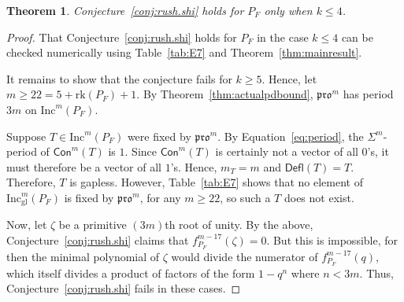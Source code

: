 \documentclass[12pt]{amsart}
\newtheorem{theorem}{Theorem}[section]
\theoremstyle{definition}
\theoremstyle{remark}
\numberwithin{equation}{section}
\newcommand{\inc}{\ensuremath{\mathrm{Inc}}}
\newcommand{\incgl}{\inc_{\mathrm{gl}}}
\newcommand{\pro}{\mathfrak{pro}}
\newcommand{\rank}{\ensuremath{\mathrm{rk}}}
\newcommand{\deflate}{\ensuremath{\mathsf{Defl}}}
\newcommand{\content}{\ensuremath{\mathsf{Con}}}
\begin{document}
\begin{theorem}\label{thm:F_bad}
Conjecture~\ref{conj:rush.shi} holds for $P_F$ only when $k \leq 4$.
\end{theorem}
\begin{proof}
That Conjecture~\ref{conj:rush.shi} holds for $P_F$ in the case $k \leq 4$ can be checked numerically using Table~\ref{tab:E7} and Theorem~\ref{thm:mainresult}.

It remains to show that the conjecture fails for $k \geq 5$. Hence, let $m \geq 22 = 5 +  \rank(P_F) + 1$. By Theorem~\ref{thm:actualpdbound}, $\pro^m$ has period $3m$ on $\inc^m(P_F)$. 

Suppose $T \in \inc^m(P_F)$ were fixed by $\pro^m$.  By Equation~\ref{eq:period}, the $\Sigma^m$-period of $\content^m(T)$ is $1$. Since $\content^m(T)$ is certainly not a vector of all $0$'s, it must therefore be a vector of all $1$'s. Hence, $m_T = m$ and $\deflate(T) = T$. Therefore, $T$ is gapless. However, Table~\ref{tab:E7} shows that no element of $\incgl^m(P_F)$ is fixed by $\pro^m$, for any $m \geq 22$, so such a $T$ does not exist.

Now, let $\zeta$ be a primitive $(3m)$th root of unity. By the above, Conjecture~\ref{conj:rush.shi} claims that $f_{P_F}^{m-17}(\zeta) = 0$. But this is impossible, for then the minimal polynomial of $\zeta$ would divide the numerator of $f^{m-17}_{P_F}(q)$, which itself divides a product of factors of the form $1-q^n$ where $n < 3m$. Thus, Conjecture~\ref{conj:rush.shi} fails in these cases. 
\end{proof}
\end{document}
